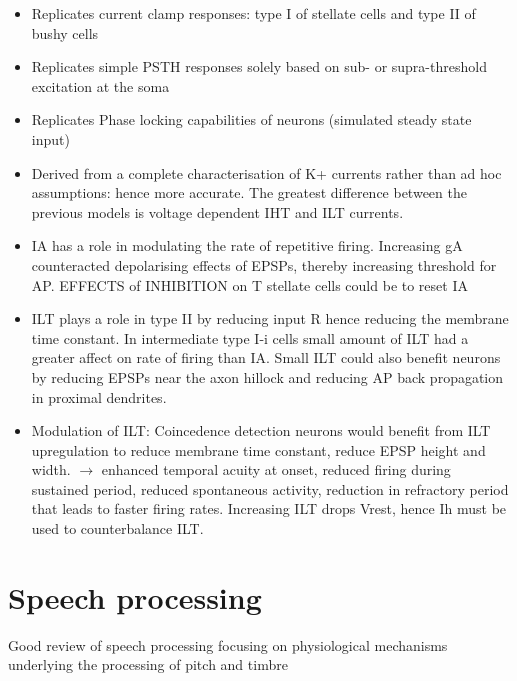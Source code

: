 \documentclass[10pt,a4paper]{article}
\begin{document}
\begin{itemize}
\item Replicates current clamp responses: type I of stellate cells and type II
  of bushy cells
\item Replicates simple PSTH responses solely based on sub- or supra-threshold
  excitation at the soma
\item Replicates Phase locking capabilities of neurons (simulated steady state
  input)
\item Derived from a complete characterisation of K+ currents rather than ad hoc
  assumptions: hence more accurate.  The greatest difference between the
  previous models is voltage dependent IHT and ILT currents.
\item IA has a role in modulating the rate of repetitive firing.  Increasing gA
  counteracted depolarising effects of EPSPs, thereby increasing threshold for
  AP.  EFFECTS of INHIBITION on T stellate cells could be to reset IA
\item ILT plays a role in type II by reducing input R hence reducing the
  membrane time constant.  In intermediate type I-i cells small amount of ILT
  had a greater affect on rate of firing than IA. Small ILT could also benefit
  neurons by reducing EPSPs near the axon hillock and reducing AP back
  propagation in proximal dendrites.
\item Modulation of ILT: Coincedence detection neurons would benefit from ILT
  upregulation to reduce membrane time constant, reduce EPSP height and
  width. \ensuremath{\rightarrow} enhanced temporal acuity at onset, reduced
  firing during sustained period, reduced spontaneous activity, reduction in
  refractory period that leads to faster firing rates.  Increasing ILT drops
  Vrest, hence Ih must be used to counterbalance ILT.
\end{itemize}
\section{Speech processing}
\citep{PalmerShamma:2003} Good review of speech processing focusing on
physiological mechanisms underlying the processing of pitch and timbre
\end{document}
